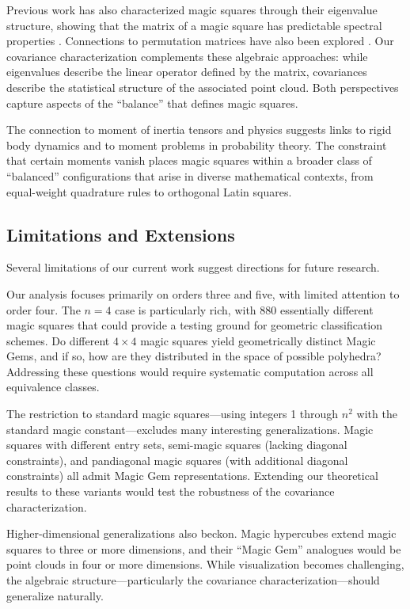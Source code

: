 Previous work has also characterized magic squares through their eigenvalue structure,
showing that the matrix of a magic square has predictable spectral properties
\cite{loly2004eigenproperties, loly2009spectra, nordgren2012spectral, chan2013eigenvalues}.
Connections to permutation matrices have also been explored \cite{beck2000magic}.
Our covariance characterization complements these algebraic approaches: 
while eigenvalues describe the linear operator defined by the matrix,
covariances describe the statistical structure of the associated point cloud.
Both perspectives capture aspects of the ``balance'' that defines magic squares.

The connection to moment of inertia tensors and physics suggests links to rigid body dynamics
and to moment problems in probability theory.
The constraint that certain moments vanish places magic squares within a broader class
of ``balanced'' configurations that arise in diverse mathematical contexts,
from equal-weight quadrature rules to orthogonal Latin squares.

\subsection{Limitations and Extensions}

Several limitations of our current work suggest directions for future research.

Our analysis focuses primarily on orders three and five, with limited attention to order four.
The $n = 4$ case is particularly rich, with 880 essentially different magic squares
that could provide a testing ground for geometric classification schemes.
Do different $4 \times 4$ magic squares yield geometrically distinct Magic Gems,
and if so, how are they distributed in the space of possible polyhedra?
Addressing these questions would require systematic computation across all equivalence classes.

The restriction to standard magic squares---using integers 1 through $n^2$ with the standard magic constant---excludes
many interesting generalizations.
Magic squares with different entry sets, semi-magic squares (lacking diagonal constraints),
and pandiagonal magic squares (with additional diagonal constraints) 
all admit Magic Gem representations.
Extending our theoretical results to these variants would test the robustness of the covariance characterization.

Higher-dimensional generalizations also beckon.
Magic hypercubes extend magic squares to three or more dimensions,
and their ``Magic Gem'' analogues would be point clouds in four or more dimensions.
While visualization becomes challenging, the algebraic structure---particularly the covariance characterization---should 
generalize naturally.

